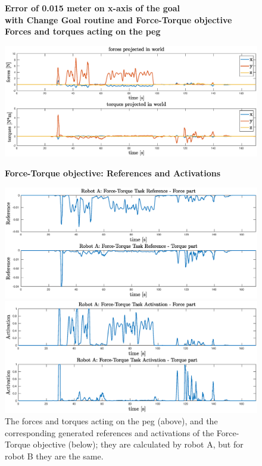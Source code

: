 \begin{figure}[H]
	\centering
	\textbf{Error of 0.015 meter on x-axis of the goal\\}
	\textbf{with Change Goal routine and Force-Torque objective}\\
	\vspace{13px}
	\textbf{Forces and torques acting on the peg\\}
	\vspace{3px}
	\centerline{ 
		\includegraphics[width=15.5cm]{error_all/force.eps}
	}
	\vspace{10px}
	\textbf{Force-Torque objective: References and Activations\\}
	\vspace{3px}
	\centerline{
		\includegraphics[width=15.5cm]{error_all/referenceForceTask.eps}
	}
	\centerline{
		\includegraphics[width=15.5cm]{error_all/activationForceTask.eps}
	}

	\caption[Plots with reference and activation of the Force-Torque tobjective]{The forces and torques acting on the peg (above), and the corresponding generated references and activations  of the Force-Torque objective (below); they are calculated by robot A, but for robot B they are the same.}
	\label{fig:forceTaskActRef}
\end{figure}

